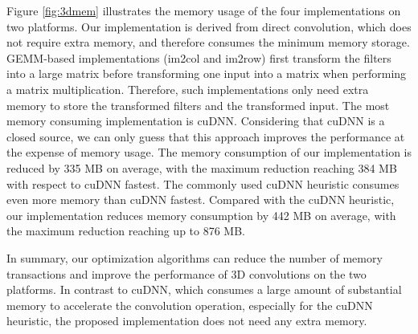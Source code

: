 Figure \ref{fig:3dmem} illustrates the memory usage of the four implementations on two platforms. Our implementation is derived from direct convolution, which does not require extra memory, and therefore consumes the minimum memory storage. GEMM-based implementations (im2col and im2row) first transform the filters into a large matrix before transforming one input into a matrix when performing a matrix multiplication. Therefore, such implementations only need extra memory to store the transformed filters and the transformed input. The most memory consuming
implementation is cuDNN. Considering that cuDNN is a closed source, we can only guess that this approach improves the performance at the expense of memory usage. The
memory consumption of our implementation is reduced by 335 MB on average, with the maximum reduction reaching 384 MB with respect to cuDNN fastest. The commonly used
cuDNN heuristic consumes even more memory than cuDNN fastest. Compared with the cuDNN heuristic, our implementation reduces  memory consumption by 442 MB on average, with the maximum reduction reaching up to 876 MB.

In summary, our optimization algorithms can reduce the number of memory transactions and improve the performance of 3D convolutions on the two platforms. In contrast to cuDNN, which consumes a large amount of substantial memory to accelerate the convolution operation, especially for the cuDNN heuristic, the proposed implementation does not need any extra memory.

